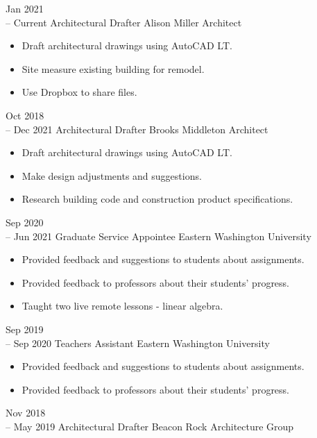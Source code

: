 \documentclass[11pt]{developercv} %
\begin{document}
\begin{entrylist}
	\entry
	{Jan 2021\\
	-- Current}
	{Architectural Drafter}
	{Alison Miller Architect}
	{\vspace{-0.5cm}\begin{itemize}
		\item Draft architectural drawings using AutoCAD LT.
		\item Site measure existing building for remodel.
		\item Use Dropbox to share files.
	\end{itemize}}
	\entry
		{Oct 2018 \\
		-- Dec 2021}
		{Architectural Drafter}
		{Brooks Middleton Architect}
		{\vspace{-0.5cm}\begin{itemize}
			\item Draft architectural drawings using AutoCAD LT.
			\item Make design adjustments and suggestions.
			\item Research building code and construction product specifications.
		\end{itemize}}
	\entry
		{Sep 2020 \\
		-- Jun 2021}
		{Graduate Service Appointee}
		{Eastern Washington University}
		{\vspace{-0.5cm}\begin{itemize}
			\item Provided feedback and suggestions to students about assignments. 
			\item Provided feedback to professors about their students' progress. 
			\item Taught two live remote lessons - linear algebra.
		\end{itemize}}
	\entry
		{Sep 2019 \\
		-- Sep 2020}
		{Teachers Assistant}
		{Eastern Washington University}
		{\vspace{-0.5cm}\begin{itemize}
			\item Provided feedback and suggestions to students about assignments. 
			\item Provided feedback to professors about their students' progress. 
		\end{itemize}}
	\entry
		{Nov 2018 \\
		-- May 2019}
		{Architectural Drafter}
		{Beacon Rock Architecture Group}
		{\vspace{-0.5cm}\begin{itemize}

\end{itemize}}
\end{entrylist}
\end{document}
